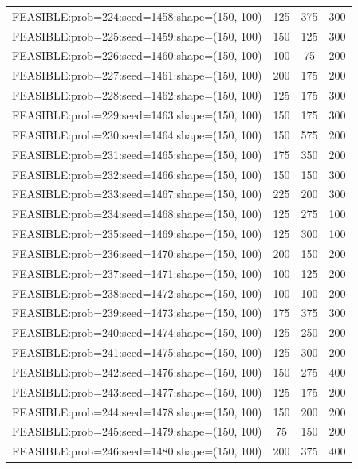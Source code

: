 \begin{longtable}{lccc}
FEASIBLE:prob=224:seed=1458:shape=(150, 100) &      125 &   375 &    300 \\
FEASIBLE:prob=225:seed=1459:shape=(150, 100) &      150 &   125 &    300 \\
FEASIBLE:prob=226:seed=1460:shape=(150, 100) &      100 &    75 &    200 \\
FEASIBLE:prob=227:seed=1461:shape=(150, 100) &      200 &   175 &    200 \\
FEASIBLE:prob=228:seed=1462:shape=(150, 100) &      125 &   175 &    300 \\
FEASIBLE:prob=229:seed=1463:shape=(150, 100) &      150 &   175 &    300 \\
FEASIBLE:prob=230:seed=1464:shape=(150, 100) &      150 &   575 &    200 \\
FEASIBLE:prob=231:seed=1465:shape=(150, 100) &      175 &   350 &    200 \\
FEASIBLE:prob=232:seed=1466:shape=(150, 100) &      150 &   150 &    300 \\
FEASIBLE:prob=233:seed=1467:shape=(150, 100) &      225 &   200 &    300 \\
FEASIBLE:prob=234:seed=1468:shape=(150, 100) &      125 &   275 &    100 \\
FEASIBLE:prob=235:seed=1469:shape=(150, 100) &      125 &   300 &    100 \\
FEASIBLE:prob=236:seed=1470:shape=(150, 100) &      200 &   150 &    200 \\
FEASIBLE:prob=237:seed=1471:shape=(150, 100) &      100 &   125 &    200 \\
FEASIBLE:prob=238:seed=1472:shape=(150, 100) &      100 &   100 &    200 \\
FEASIBLE:prob=239:seed=1473:shape=(150, 100) &      175 &   375 &    300 \\
FEASIBLE:prob=240:seed=1474:shape=(150, 100) &      125 &   250 &    200 \\
FEASIBLE:prob=241:seed=1475:shape=(150, 100) &      125 &   300 &    200 \\
FEASIBLE:prob=242:seed=1476:shape=(150, 100) &      150 &   275 &    400 \\
FEASIBLE:prob=243:seed=1477:shape=(150, 100) &      125 &   175 &    200 \\
FEASIBLE:prob=244:seed=1478:shape=(150, 100) &      150 &   200 &    200 \\
FEASIBLE:prob=245:seed=1479:shape=(150, 100) &       75 &   150 &    200 \\
FEASIBLE:prob=246:seed=1480:shape=(150, 100) &      200 &   375 &    400 \\

\end{longtable}
